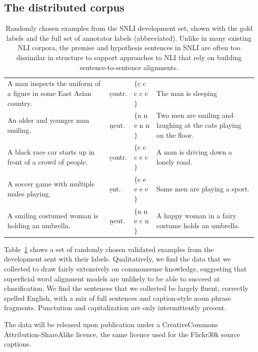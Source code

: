 \subsection{The distributed corpus}

\begin{table}
  \centering\footnotesize
  \begin{tabular}{p{6cm}p{0.75cm}p{1.4cm}p{6cm}}
  \toprule
A man inspects the uniform of a figure in some East Asian country. & \b{contr.}& \t{$\{$c c c c c$\}$} & The man is sleeping\\
\rule{0pt}{3ex}An older and younger man smiling. & \b{neut.}& \t{$\{$n n e n n$\}$} & Two men are smiling and laughing at the cats playing on the floor.\\
\rule{0pt}{3ex}A black race car starts up in front of a crowd of people. & \b{contr.}& \t{$\{$c c c c c$\}$} & A man is driving down a lonely road.\\
\rule{0pt}{3ex}A soccer game with multiple males playing. & \b{ent.}& \t{$\{$e e e e e$\}$} & Some men are playing a sport.\\
\rule{0pt}{3ex}A smiling costumed woman is holding an umbrella. & \b{neut.}& \t{$\{$n n e c n$\}$} & A happy woman in a fairy costume holds an umbrella.\\
    \bottomrule
  \end{tabular}
  \caption{\label{snli-examples}Randomly chosen examples from the SNLI development set, shown with the gold labels and the full set of annotator labels (abbreviated). Unlike in many existing NLI corpora, the premise and hypothesis sentences in SNLI are often too dissimilar in structure to support approaches to NLI that rely on building sentence-to-sentence alignments.}
\end{table}

Table~\ref{snli-examples} shows a set of randomly chosen validated examples from the development sent with their labels. Qualitatively, we find the data that we collected to draw fairly extensively on commonsense knowledge, suggesting that superficial word alignment models are unlikely to be able to succeed at classification. We find the sentences that we collected be largely fluent, correctly spelled English, with a mix of full sentences and caption-style noun phrase fragments. Punctution and capitalization are only intermittently present.

The data will be released upon publication under a CreativeCommons
Attribution-ShareAlike licence, the same licence used for the Flickr30k source captions.

